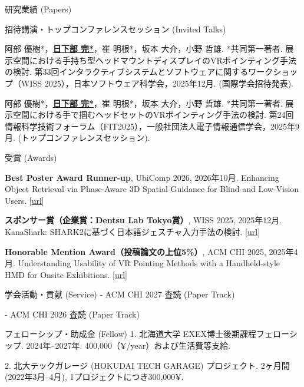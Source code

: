 \documentclass[
	11pt, %
]{resume} %
\begin{document}
\begin{rSection}{研究業績 (Papers)}
    \begin{rSubsection}{招待講演・トップコンファレンスセッション (Invited Talks)}{}{}{}
        \item 阿部 優樹*，\underline{\textbf{日下部 完*}}，崔 明根*，坂本 大介，小野 哲雄. *共同第一著者. 展示空間における手持ち型ヘッドマウントディスプレイのVRポインティング手法の検討. 第33回インタラクティブシステムとソフトウェアに関するワークショップ（WISS 2025），日本ソフトウェア科学会，2025年12月. (国際学会招待発表).
        
        \item 阿部 優樹*，\underline{\textbf{日下部 完*}}，崔 明根*，坂本 大介，小野 哲雄. *共同第一著者. 展示空間における手で掴むヘッドセットのVRポインティング手法の検討. 第24回情報科学技術フォーラム（FIT2025），一般社団法人電子情報通信学会，2025年9月. (トップコンファレンスセッション).
	\end{rSubsection}

\end{rSection}

\begin{rSection}{受賞 (Awards)}
	\item \textbf{Best Poster Award Runner-up}, UbiComp 2026, 2026年10月. Enhancing Object Retrieval via Phase-Aware 3D Spatial Guidance for Blind and Low-Vision Users. [\href{https://www.ubicomp.org/ubicomp-iswc-2026/awards-all/}{url}]
	\item \textbf{スポンサー賞（企業賞：Dentsu Lab Tokyo賞）}, WISS 2025, 2025年12月. KanaShark: SHARK2に基づく日本語ジェスチャ入力手法の検討. [\href{https://www.wiss.org/WISS2025/award.html}{url}]
	\item \textbf{Honorable Mention Award（投稿論文の上位5\%）}, ACM CHI 2025, 2025年4月. Understanding Usability of VR Pointing Methods with a Handheld-style HMD for Onsite Exhibitions. [\href{https://programs.sigchi.org/chi/2025/awards/honorable-mentions}{url}]
\end{rSection}
\begin{rSection}{学会活動・貢献 (Service)}{}{}{}
    - ACM CHI 2027 査読 (Paper Track)

    - ACM CHI 2026 査読 (Paper Track)
\end{rSection}

\begin{rSection}{フェローシップ・助成金 (Fellow)}
    1. 北海道大学 EXEX博士後期課程フェローシップ. 2024年--2027年. 400,000（¥/year）および生活費等支給.
    
    2. 北大テックガレージ (HOKUDAI TECH GARAGE) プロジェクト. 2ヶ月間 (2022年3月--4月), 1プロジェクトにつき300,000¥.
\end{rSection}
\end{document}
